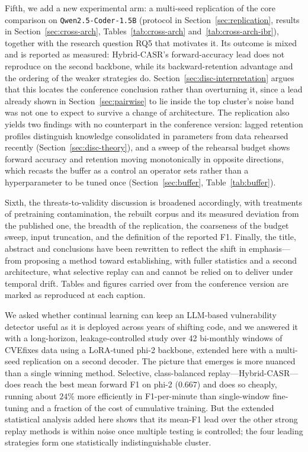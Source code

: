 Fifth, we add a new experimental arm: a multi-seed replication of the core comparison on \texttt{Qwen2.5-Coder-1.5B} (protocol in Section~\ref{sec:replication}, results in Section~\ref{sec:cross-arch}, Tables~\ref{tab:cross-arch} and~\ref{tab:cross-arch-ibr}), together with the research question RQ5 that motivates it. Its outcome is mixed and is reported as measured: Hybrid-CASR's forward-accuracy lead does not reproduce on the second backbone, while its backward-retention advantage and the ordering of the weaker strategies do. Section~\ref{sec:disc-interpretation} argues that this locates the conference conclusion rather than overturning it, since a lead already shown in Section~\ref{sec:pairwise} to lie inside the top cluster's noise band was not one to expect to survive a change of architecture. The replication also yields two findings with no counterpart in the conference version: lagged retention profiles distinguish knowledge consolidated in parameters from data rehearsed recently (Section~\ref{sec:disc-theory}), and a sweep of the rehearsal budget shows forward accuracy and retention moving monotonically in opposite directions, which recasts the buffer as a control an operator sets rather than a hyperparameter to be tuned once (Section~\ref{sec:buffer}, Table~\ref{tab:buffer}).

Sixth, the threats-to-validity discussion is broadened accordingly, with treatments of pretraining contamination, the rebuilt corpus and its measured deviation from the published one, the breadth of the replication, the coarseness of the budget sweep, input truncation, and the definition of the reported F1. Finally, the title, abstract and conclusions have been rewritten to reflect the shift in emphasis---from proposing a method toward establishing, with fuller statistics and a second architecture, what selective replay can and cannot be relied on to deliver under temporal drift. Tables and figures carried over from the conference version are marked as reproduced at each caption.



We asked whether continual learning can keep an LLM-based vulnerability detector useful as it is deployed across years of shifting code, and we answered it with a long-horizon, leakage-controlled study over 42 bi-monthly windows of CVEfixes data using a LoRA-tuned phi-2 backbone, extended here with a multi-seed replication on a second decoder. The picture that emerges is more nuanced than a single winning method. Selective, class-balanced replay---Hybrid-CASR---does reach the best mean forward F1 on phi-2 ($0.667$) and does so cheaply, running about $24\%$ more efficiently in F1-per-minute than single-window fine-tuning and a fraction of the cost of cumulative training. But the extended statistical analysis added here shows that its mean-F1 lead over the other strong replay methods is within noise once multiple testing is controlled; the four leading strategies form one statistically indistinguishable cluster.

